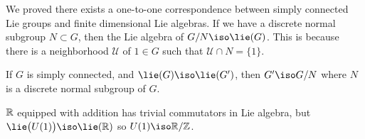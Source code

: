 We proved there exists a one-to-one correspondence between simply
connected Lie groups and finite dimensional Lie algebras. If we
have a discrete normal subgroup $N\subset G$, then the Lie
algebra of $G/N\iso\lie(G)$. This is because there is a
neighborhood $\mathcal{U}$ of $1\in G$ such that $\mathcal{U}\cap
N=\{1\}$. 

\begin{thm}
If $G$ is simply connected, and $\lie(G)\iso\lie(G')$, then
$G'\iso G/N$ where $N$ is a discrete normal subgroup of $G$.
\end{thm}
\begin{ex}
$\Bbb{R}$ equipped with addition has trivial commutators in Lie
  algebra, but $\lie\big(U(1)\big)\iso\lie(\Bbb{R})$ so
  $U(1)\iso\Bbb{R}/\Bbb{Z}$. 
\end{ex}
